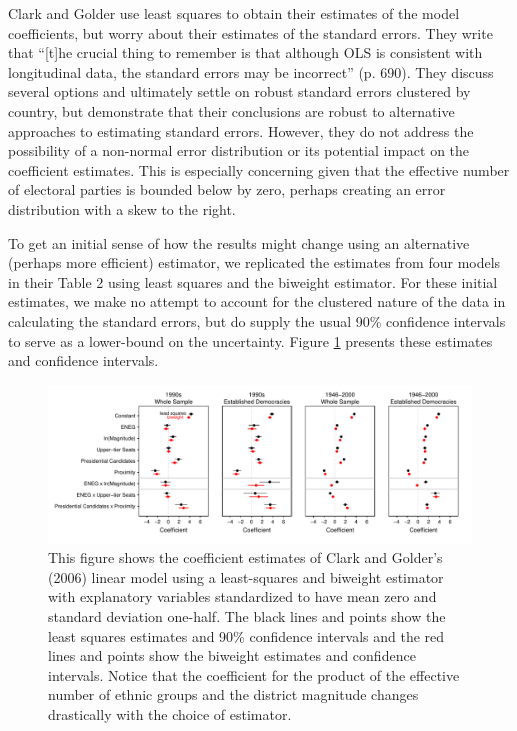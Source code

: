 \documentclass[12pt]{article}
\begin{document}
Clark and Golder use least squares to obtain their estimates of the model coefficients, but worry about their estimates of the standard errors. 
They write that ``[t]he crucial thing to remember is that although OLS is consistent with longitudinal data, the standard errors may be incorrect'' (p. 690). 
They discuss several options and ultimately settle on robust standard errors clustered by country, but demonstrate that their conclusions are robust to alternative approaches to estimating standard errors. 
However, they do not address the possibility of a non-normal error distribution or its potential impact on the coefficient estimates. 
This is especially concerning given that the effective number of electoral parties is bounded below by zero, perhaps creating an error distribution with a skew to the right. 

To get an initial sense of how the results might change using an alternative (perhaps more efficient) estimator, we replicated the estimates from four models in their Table 2 using least squares and the biweight estimator. 
For these initial estimates, we make no attempt to account for the clustered nature of the data in calculating the standard errors, but do supply the usual 90\% confidence intervals to serve as a lower-bound on the uncertainty. 
Figure \ref{fig:cg-coef-plots} presents these estimates and confidence intervals.

\begin{figure}[h!]
\begin{center}
\includegraphics[scale = .8]{figs/cg-coef-plots.pdf}
\caption{This figure shows the coefficient estimates of Clark and Golder's (2006) linear model using a least-squares and biweight estimator with explanatory variables standardized to have mean zero and standard deviation one-half. 
The black lines and points show the least squares estimates and 90\% confidence intervals and the red lines and points show the biweight estimates and confidence intervals. 
Notice that the coefficient for the product of the effective number of ethnic groups and the district magnitude changes drastically with the choice of estimator.}\label{fig:cg-coef-plots}
\end{center}
\end{figure}
\end{document}
